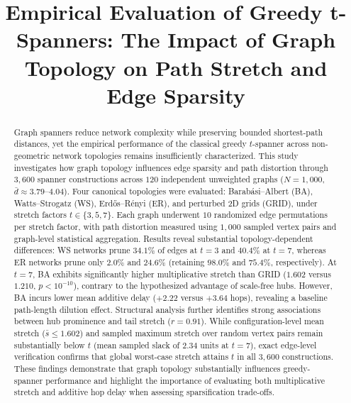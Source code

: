 \documentclass[conference]{IEEEtran}
\begin{document}
\title{Empirical Evaluation of Greedy t-Spanners: The Impact of Graph Topology on Path Stretch and Edge Sparsity}

\author{
}

\maketitle
\raggedbottom
\setlength{\textfloatsep}{10pt plus 2pt minus 2pt}

\begin{abstract}
Graph spanners reduce network complexity while preserving bounded shortest-path distances, yet the empirical performance of the classical greedy $t$-spanner across non-geometric network topologies remains insufficiently characterized. This study investigates how graph topology influences edge sparsity and path distortion through $3,600$ spanner constructions across $120$ independent unweighted graphs ($N=1,000$, $\bar{d}\approx3.79\text{--}4.04$). Four canonical topologies were evaluated: Barab\'{a}si--Albert (BA), Watts--Strogatz (WS), Erd\H{o}s--R\'{e}nyi (ER), and perturbed 2D grids (GRID), under stretch factors $t\in\{3,5,7\}$. Each graph underwent $10$ randomized edge permutations per stretch factor, with path distortion measured using $1,000$ sampled vertex pairs and graph-level statistical aggregation. Results reveal substantial topology-dependent differences: WS networks prune $34.1\%$ of edges at $t=3$ and $40.4\%$ at $t=7$, whereas ER networks prune only $2.0\%$ and $24.6\%$ (retaining $98.0\%$ and $75.4\%$, respectively). At $t=7$, BA exhibits significantly higher multiplicative stretch than GRID ($1.602$ versus $1.210$, $p<10^{-10}$), contrary to the hypothesized advantage of scale-free hubs. However, BA incurs lower mean additive delay ($+2.22$ versus $+3.64$ hops), revealing a baseline path-length dilution effect. Structural analysis further identifies strong associations between hub prominence and tail stretch ($r=0.91$). While configuration-level mean stretch ($\bar{s}\le1.602$) and sampled maximum stretch over random vertex pairs remain substantially below $t$ (mean sampled slack of $2.34$ units at $t=7$), exact edge-level verification confirms that global worst-case stretch attains $t$ in all $3,600$ constructions. These findings demonstrate that graph topology substantially influences greedy-spanner performance and highlight the importance of evaluating both multiplicative stretch and additive hop delay when assessing sparsification trade-offs.
\end{abstract}
\end{document}
